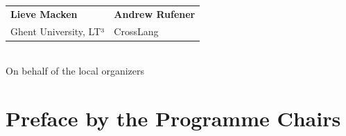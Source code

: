 \documentclass[a4paper,11pt,twoside]{book}
\begin{document}
\vspace{1cm}
\begin{center}
\begin{tabular}{p{5cm}p{5cm}}
\textbf{Lieve Macken} & \textbf{Andrew Rufener}\\
Ghent University, LT³ & CrossLang\\
\end{tabular}
\vspace{0.5cm}
\\
\noindent On behalf of the local organizers
\end{center}


\chapter*{Preface by the Programme Chairs}
\end{document}
